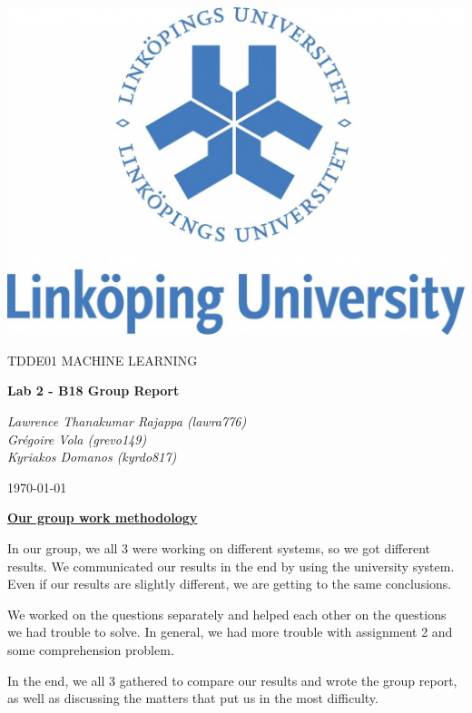 \documentclass[a4paper,10pt]{article}
\begin{document}
\begin{titlepage}
	\centering
	\includegraphics[width=.6\textwidth]{liu-logo.png}\par
	\vfill
	{\scshape\Large TDDE01 MACHINE LEARNING\par}
	{\huge\bfseries Lab 2 - B18 Group Report\par}
	\vspace{0.5cm}
    {\large\itshape Lawrence Thanakumar Rajappa (lawra776)\\
     \large\itshape Grégoire Vola (grevo149)\\
     \large\itshape Kyriakos Domanos (kyrdo817)\par}
	\vfill
	{\large \today\par}
\end{titlepage}
\textbf{\underline{Our group work methodology}} \par
In our group, we all 3 were working on different systems, so we got different results.
We communicated our results in the end by using the university system. Even if our results are slightly different, we are getting to the same conclusions.

We worked on the questions separately and helped each other on the questions we had trouble to solve. In general, we had more trouble with assignment 2 and some comprehension problem.

In the end, we all 3 gathered to compare our results and wrote the group report, as well as discussing the matters that put us in the most difficulty. \par
\vspace{0.5cm}
\end{document}
